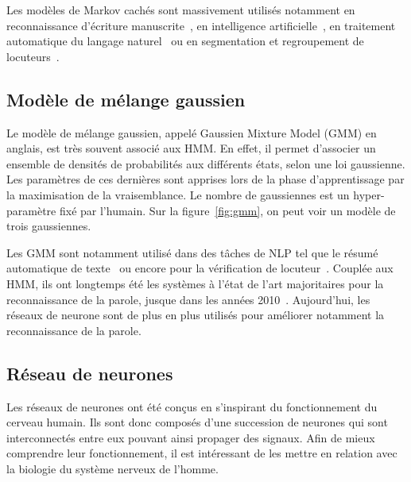 Les modèles de Markov cachés sont massivement utilisés notamment en reconnaissance d'écriture manuscrite~\cite{Hu1996}, en intelligence artificielle~\cite{Gales2008}, en traitement automatique du langage naturel~\cite{Campbell2006} ou en segmentation et regroupement de locuteurs~\cite{Ajmera2002}.

\subsection{Modèle de mélange gaussien}
Le modèle de mélange gaussien, appelé Gaussien Mixture Model (GMM) en anglais, est très souvent associé aux HMM. En effet, il permet d'associer un ensemble de densités de probabilités aux différents états, selon une loi gaussienne. Les paramètres de ces dernières sont apprises lors de la phase d'apprentissage par la maximisation de la vraisemblance. Le nombre de gaussiennes est un hyper-paramètre fixé par l'humain. Sur la figure~\ref{fig:gmm}, on peut voir un modèle de trois gaussiennes.



Les GMM sont notamment utilisé dans des tâches de NLP tel que le résumé automatique de texte~\cite{Fattah2009} ou encore pour la vérification de locuteur~\cite{Baker2005}. Couplée aux HMM, ils ont longtemps été les systèmes à l'état de l'art majoritaires pour la reconnaissance de la parole, jusque dans les années 2010~\cite{Hinton2012}. Aujourd'hui, les réseaux de neurone sont de plus en plus utilisés pour améliorer notamment la reconnaissance de la parole.

\subsection{Réseau de neurones}
Les réseaux de neurones ont été conçus en s'inspirant du fonctionnement du cerveau humain. Ils sont donc composés d'une succession de neurones qui sont interconnectés entre eux pouvant ainsi propager des signaux.
Afin de mieux comprendre leur fonctionnement, il est intéressant de les mettre en relation avec la biologie du système nerveux de l'homme.

